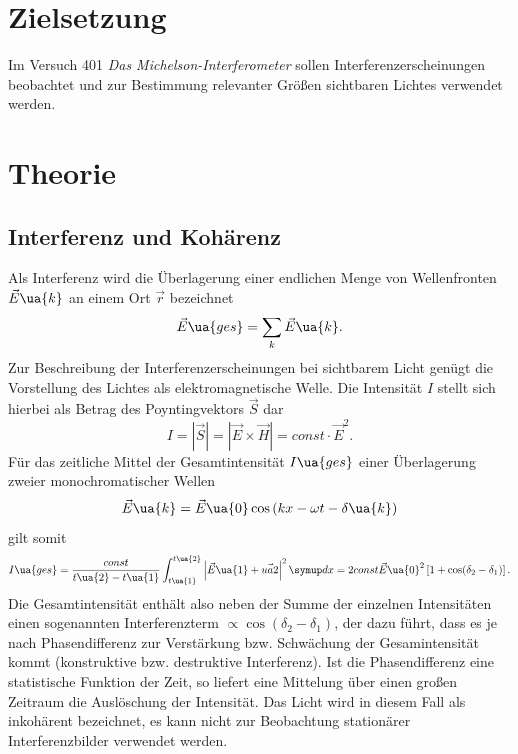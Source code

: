 \setcounter{page}{1}
\section*{Zielsetzung}
Im Versuch 401 \emph{Das Michelson-Interferometer} sollen Interferenzerscheinungen beobachtet und zur Bestimmung
relevanter Größen sichtbaren Lichtes verwendet werden.
\section{Theorie}
\subsection{Interferenz und Kohärenz}
Als Interferenz wird die Überlagerung einer endlichen Menge von Wellenfronten $\vec{E}\ua{k}$ an einem Ort $\vec{r}$ bezeichnet
\begin{equation}
  \vec{E}\ua{ges} = \sum_k \vec{E}\ua{k}.
\end{equation}
Zur Beschreibung der Interferenzerscheinungen bei sichtbarem Licht genügt die Vorstellung des Lichtes als elektromagnetische
Welle. Die Intensität $I$ stellt sich hierbei als Betrag des Poyntingvektors $\vec{S}$ dar
\begin{equation}
  I = \left|\vec{S}\right| = \left| \vec{E} \times \vec{H}\right| = const \cdot \vec{E}^2.
\end{equation}
Für das zeitliche Mittel der Gesamtintensität $I\ua{ges}$ einer Überlagerung zweier monochromatischer Wellen
\begin{equation}
  \vec{E}\ua{k} = \vec{E}\ua{0}\cos\left(kx - \omega t - \delta\ua{k} \right)
\end{equation}
gilt somit
\begin{equation}
  I\ua{ges} = \frac{const}{t\ua{2}- t\ua{1}}\int_{t\ua{1}}^{t\ua{2}}\left| \vec{E}\ua{1} + \vec{ua{2}} \right|^2 \dif{x} = 2const\vec{E}\ua{0}^2\left[1 + \cos(\delta_2- \delta_1)\right].
\end{equation}
Die Gesamtintensität enthält also neben der Summe der einzelnen Intensitäten einen sogenannten Interferenzterm $\propto \cos(\delta_2-\delta_1)$, der dazu führt, dass
es je nach Phasendifferenz zur Verstärkung bzw. Schwächung der Gesamintensität kommt (konstruktive bzw. destruktive Interferenz). Ist die Phasendifferenz eine
statistische Funktion der Zeit, so liefert eine Mittelung über einen großen Zeitraum die Auslöschung der Intensität. Das Licht wird in diesem Fall als inkohärent
bezeichnet, es kann nicht zur Beobachtung stationärer Interferenzbilder verwendet werden.
